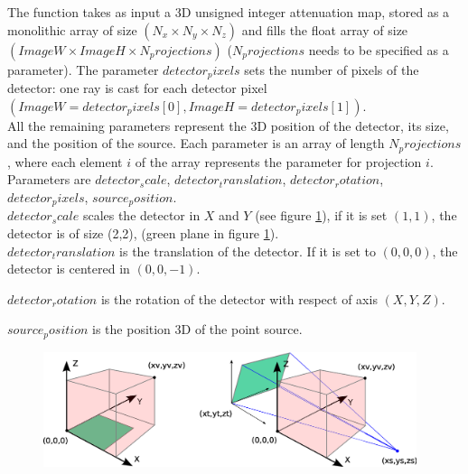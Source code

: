 \documentclass[12pt,a4paper]{report}
\begin{document}
The function takes as input a 3D unsigned integer attenuation map, stored as a monolithic array of size $(N_x\times N_y\times N_z)$ and fills the float 
array of size $(ImageW\times ImageH\times N_projections)$ ($N_projections$ needs to be specified as a parameter). 
The parameter $detector_pixels$ sets the number of pixels of the detector: one ray is cast for each detector pixel $(ImageW=detector_pixels[0],
ImageH=detector_pixels[1])$. \\
All the remaining parameters represent the 3D position of the detector, its size, and the position of the source. 
Each parameter is an array of length $N_projections$, where each element $i$ of the array represents the parameter for projection $i$. 
Parameters are $detector_scale$, $detector_translation$, $detector_rotation$, $detector_pixels$, $source_position$. \\

$detector_scale$ scales the detector in $X$ and $Y$ (see figure \ref{fig_api}), if it is set $(1,1)$, the detector is of size (2,2), (green plane in figure \ref{fig_api}). \\

$detector_translation$ is the translation of the detector. If it is set to $(0,0,0)$, the detector is centered in $(0,0,-1)$. 

$detector_rotation$ is the rotation of the detector with respect of axis $(X,Y,Z)$. 

$source_position$ is the position 3D of the point source. 

\begin{figure}[h]
\centering
\includegraphics[width=4.3in]{tt_ray_api}
\caption{ }
\label{fig_api}
\end{figure}




\vspace{5mm}




\end{document}
